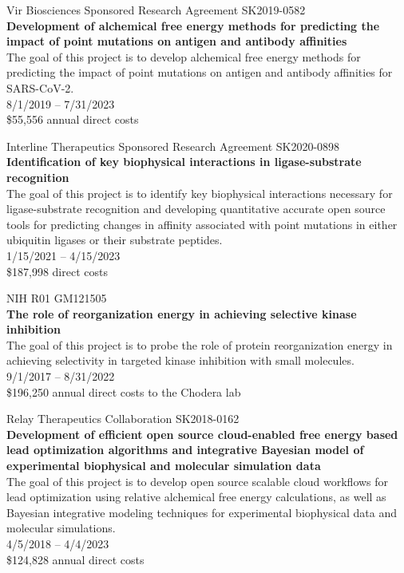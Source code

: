 \documentclass[10pt]{article}
\begin{document}
Vir Biosciences Sponsored Research Agreement SK2019-0582 \\
{\bf Development of alchemical free energy methods for predicting the impact of point mutations on antigen and antibody affinities}\\
The goal of this project is to develop alchemical free energy methods for predicting the impact of point mutations on antigen and antibody affinities for SARS-CoV-2.\\
8/1/2019 -- 7/31/2023\\
\$55,556 annual direct costs

\vspace{1.5ex}

Interline Therapeutics Sponsored Research Agreement SK2020-0898 \\
{\bf Identification of key biophysical interactions in ligase-substrate recognition} \\
The goal of this project is to identify key biophysical interactions necessary for ligase-substrate recognition and developing quantitative accurate open source tools for predicting changes in affinity associated with point mutations in either ubiquitin ligases or their substrate peptides. \\
1/15/2021 -- 4/15/2023\\
\$187,998 direct costs

\vspace{1.5ex}

NIH R01 GM121505 \\
{\bf The role of reorganization energy in achieving selective kinase inhibition} \\
The goal of this project is to probe the role of protein reorganization energy in achieving selectivity in targeted kinase inhibition with small molecules. \\
9/1/2017 -- 8/31/2022 \\
\$196,250 annual direct costs to the Chodera lab

\vspace{1.5ex}

Relay Therapeutics Collaboration SK2018-0162\\
{\bf Development of efficient open source cloud-enabled free energy based lead optimization algorithms and integrative Bayesian model of experimental biophysical and molecular simulation data} \\
The goal of this project is to develop open source scalable cloud workflows for lead optimization using relative alchemical free energy calculations, as well as Bayesian integrative modeling techniques for experimental biophysical data and molecular simulations. \\
4/5/2018 -- 4/4/2023 \\
\$124,828 annual direct costs
\end{document}
